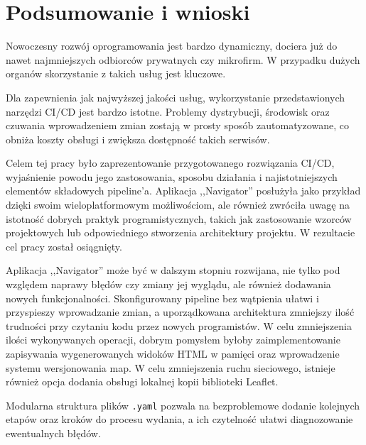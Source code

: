 \section{Podsumowanie i wnioski}
Nowoczesny rozwój oprogramowania jest bardzo dynamiczny, dociera już do nawet 
najmniejszych odbiorców prywatnych czy mikrofirm. W przypadku dużych organów 
skorzystanie z takich usług jest kluczowe.

Dla zapewnienia jak najwyższej jakości usług, wykorzystanie przedstawionych 
narzędzi CI/CD jest bardzo istotne. Problemy dystrybucji, środowisk oraz 
czuwania wprowadzeniem zmian zostają w prosty sposób zautomatyzowane, 
co obniża koszty obsługi i zwiększa dostępność takich serwisów.

Celem tej pracy było zaprezentowanie przygotowanego rozwiązania CI/CD, 
wyjaśnienie powodu jego zastosowania, sposobu działania i najistotniejszych 
elementów składowych pipeline'a. Aplikacja ,,Navigator'' posłużyła jako 
przykład dzięki swoim wieloplatformowym możliwościom, ale również zwróciła 
uwagę na istotność dobrych praktyk programistycznych, takich jak zastosowanie 
wzorców projektowych lub odpowiedniego stworzenia architektury projektu.
W rezultacie cel pracy został osiągnięty.

Aplikacja ,,Navigator'' może być w dalszym stopniu rozwijana, nie tylko pod 
względem naprawy błędów czy zmiany jej wyglądu, ale również dodawania 
nowych funkcjonalności. Skonfigurowany pipeline bez wątpienia ułatwi 
i przyspieszy wprowadzanie zmian, a uporządkowana architektura 
zmniejszy ilość trudności przy czytaniu kodu przez nowych programistów.
W celu zmniejszenia ilości wykonywanych operacji, dobrym pomysłem byłoby 
zaimplementowanie zapisywania wygenerowanych widoków HTML w pamięci 
oraz wprowadzenie systemu wersjonowania map.
W celu zmniejszenia ruchu sieciowego, istnieje również opcja 
dodania obsługi lokalnej kopii biblioteki Leaflet.

Modularna struktura plików \verb|.yaml| pozwala na bezproblemowe 
dodanie kolejnych etapów oraz kroków do procesu wydania, 
a ich czytelność ułatwi diagnozowanie ewentualnych błędów.
